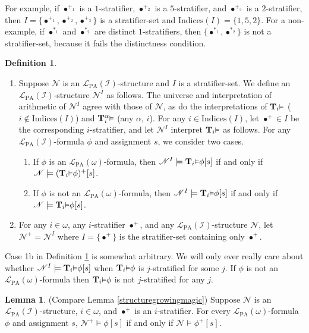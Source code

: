 \documentclass[reqno]{article}
\theoremstyle{definition}
\newtheorem{lemma}[theorem]{Lemma}
\newtheorem{definition}[theorem]{Definition}
\def\L{\mathscr{L}}
\def\T{\mathbf{T}}
\def\indices{\mathrm{Indices}}
\def\LPA{\L_{\mathrm{PA}}}
\def\indset{\mathcal I}
\renewcommand{\Pr}[1]{\T_{#1}\mbox{\small${\vDash}$}}
\newcommand{\Prr}[2]{\T^{#1}_{#2}\mbox{\small${\vDash}$}}
\begin{document}
For example, if $\bullet^{+_1}$ is a $1$-stratifier,
$\bullet^{+_2}$ is a $5$-stratifier, and $\bullet^{+_3}$ is a $2$-stratifier,
then $I=\{\bullet^{+_1},\bullet^{+_2},\bullet^{+_3}\}$ is a stratifier-set
and $\indices(I)=\{1,5,2\}$. For a non-example, if $\bullet^{*_1}$ and $\bullet^{*_2}$
are distinct $1$-stratifiers, then $\{\bullet^{*_1},\bullet^{*_2}\}$ is
not a stratifier-set, because it fails the distinctness condition.

\begin{definition}
\label{moduloidefn}
\begin{enumerate}
\item
Suppose $\mathscr N$ is an $\LPA(\indset)$-structure
and $I$ is a stratifier-set.
We define an $\LPA(\indset)$-structure $\mathscr N^I$
as follows.
The universe and interpretation of arithmetic of $\mathscr N^I$
agree with those of $\mathscr N$,
as do the interpretations of $\Pr i$ ($i\not\in\indices(I)$)
and $\Prr\alpha i$ (any $\alpha$, $i$).
For any $i\in\indices(I)$, let $\bullet^+\in I$ be the corresponding
$i$-stratifier, and let $\mathscr N^I$ interpret $\Pr i$ as follows.
For any $\LPA(\indset)$-formula $\phi$ and assignment $s$,
we consider two cases.
\begin{enumerate}
  \item If $\phi$ is an $\LPA(\omega)$-formula, then
  $\mathscr N^I \models \Pr i\phi[s]$ if and only if $\mathscr N\models (\Pr i\phi)^+[s]$.
  \item If $\phi$ is not an $\LPA(\omega)$-formula, then
  $\mathscr N^I \models \Pr i\phi[s]$ if and only if $\mathscr N\models \Pr i\phi[s]$.
\end{enumerate}
\item
For any $i\in\omega$, any $i$-stratifier $\bullet^+$, and any
$\LPA(\indset)$-structure $\mathscr N$,
let $\mathscr N^+=\mathscr N^I$ where $I=\{\bullet^+\}$
is the stratifier-set containing only $\bullet^+$.
\end{enumerate}
\end{definition}

Case 1b in Definition \ref{moduloidefn} is somewhat arbitrary.
We will only ever really care about whether
$\mathscr N^I \models \Pr i\phi[s]$ when $\Pr i\phi$ is $j$-stratified for some $j$.
If $\phi$ is not an $\LPA(\omega)$-formula then $\Pr i\phi$ is not $j$-stratified for any $j$.

\begin{lemma}
\label{structurecollapsingmagic}
(Compare Lemma \ref{structuregrowingmagic})
Suppose $\mathscr N$ is an $\LPA(\indset)$-structure, $i\in\omega$, and $\bullet^+$
is an $i$-stratifier.
For every $\LPA(\omega)$-formula $\phi$ and assignment $s$,
$\mathscr N^+\models\phi[s]$ if and only if $\mathscr N\models\phi^+[s]$.
\end{lemma}
\end{document}
